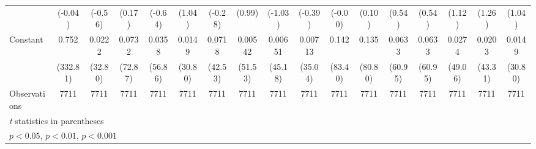 \begin{table}[htbp]
\begin{tabular}{l*{16}{c}}
                    &     (-0.04)         &     (-0.56)         &      (0.17)         &     (-0.64)         &      (1.04)         &     (-0.28)         &      (0.99)         &     (-1.03)         &     (-0.39)         &     (-0.00)         &      (0.10)         &      (0.54)         &      (0.54)         &      (1.12)         &      (1.26)         &      (1.04)         \\
\addlinespace
Constant            &       0.752\sym{***}&      0.0222\sym{***}&      0.0732\sym{***}&      0.0358\sym{***}&      0.0149\sym{***}&      0.0718\sym{***}&     0.00542\sym{***}&     0.00651\sym{***}&     0.00713\sym{***}&       0.142\sym{***}&       0.135\sym{***}&      0.0633\sym{***}&      0.0633\sym{***}&      0.0274\sym{***}&      0.0203\sym{***}&      0.0149\sym{***}\\
                    &    (332.81)         &     (32.80)         &     (72.87)         &     (56.86)         &     (30.80)         &     (42.53)         &     (51.53)         &     (45.18)         &     (35.04)         &     (83.40)         &     (80.80)         &     (60.95)         &     (60.95)         &     (49.06)         &     (43.31)         &     (30.80)         \\
\midrule
Observations        &        7711         &        7711         &        7711         &        7711         &        7711         &        7711         &        7711         &        7711         &        7711         &        7711         &        7711         &        7711         &        7711         &        7711         &        7711         &        7711         \\
\bottomrule
\multicolumn{17}{l}{\footnotesize \textit{t} statistics in parentheses}\\
\multicolumn{17}{l}{\footnotesize \sym{*} \(p<0.05\), \sym{**} \(p<0.01\), \sym{***} \(p<0.001\)}\\
\end{tabular}
\end{table}
